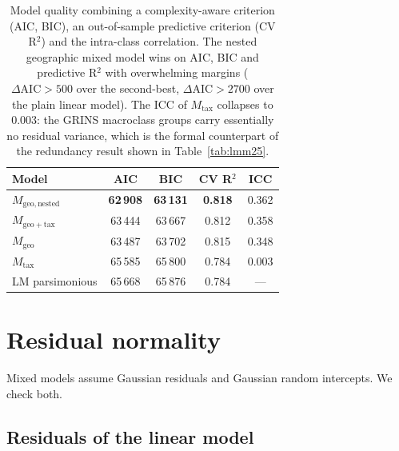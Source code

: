 \documentclass[11pt,a4paper]{article}
\begin{document}
\begin{table}[h!]
  \centering
  \begin{tabular}{l c c c c}
    \toprule
    Model & AIC & BIC & CV R$^{2}$ & ICC \\
    \midrule
    $M_{\mathrm{geo,nested}}$  & \textbf{62\,908} & \textbf{63\,131} & \textbf{0.818} & 0.362 \\
    $M_{\mathrm{geo+tax}}$     & 63\,444 & 63\,667 & 0.812 & 0.358 \\
    $M_{\mathrm{geo}}$         & 63\,487 & 63\,702 & 0.815 & 0.348 \\
    $M_{\mathrm{tax}}$         & 65\,585 & 65\,800 & 0.784 & 0.003 \\
    LM parsimonious            & 65\,668 & 65\,876 & 0.784 & --- \\
    \bottomrule
  \end{tabular}
  \caption{Model quality combining a complexity-aware criterion
    (AIC, BIC), an out-of-sample predictive criterion (CV
    R$^{2}$) and the intra-class correlation. The nested geographic
    mixed model wins on AIC, BIC and predictive R$^{2}$ with
    overwhelming margins ($\Delta \mathrm{AIC} > 500$ over the
    second-best, $\Delta \mathrm{AIC} > 2700$ over the plain linear
    model). The ICC of $M_{\mathrm{tax}}$ collapses to $0.003$: the
    GRINS macroclass groups carry essentially no residual variance,
    which is the formal counterpart of the redundancy result shown
    in Table~\ref{tab:lmm25}.}
  \label{tab:aicbic}
\end{table}

\section{Residual normality}

Mixed models assume Gaussian residuals and Gaussian random
intercepts. We check both.

\subsection{Residuals of the linear model}
\end{document}
